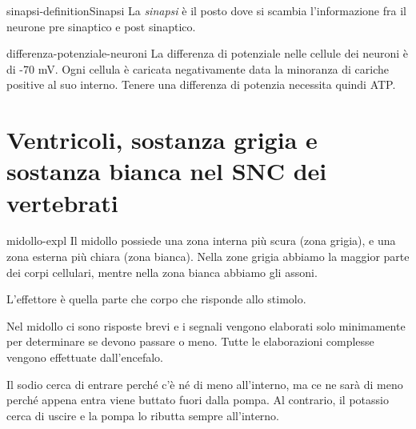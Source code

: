 \documentclass[preview]{standalone}
\begin{document}
\begin{snippetdefinition}{sinapsi-definition}{Sinapsi}
    La \textit{sinapsi} è il posto dove si scambia l'informazione
    fra il neurone pre sinaptico e post sinaptico.
\end{snippetdefinition}

\begin{snippet}{differenza-potenziale-neuroni}
    La differenza di potenziale nelle cellule dei neuroni è di -70 mV. Ogni cellula è caricata
    negativamente data la minoranza di cariche positive al suo interno.
    Tenere una differenza di potenzia necessita quindi ATP.
\end{snippet}

\section{Ventricoli, sostanza grigia e sostanza bianca nel SNC dei vertebrati}

\begin{snippet}{midollo-expl}
    Il midollo possiede una zona interna più scura (zona grigia), e una zona esterna più chiara
    (zona bianca). Nella zone grigia abbiamo la maggior parte dei corpi cellulari,
    mentre nella zona bianca abbiamo gli assoni.

    L'effettore è quella parte che corpo che risponde allo stimolo.

    Nel midollo ci sono risposte brevi e i segnali vengono elaborati solo minimamente per determinare se devono passare o meno.
    Tutte le elaborazioni complesse vengono effettuate dall'encefalo.

    Il sodio cerca di entrare perché c'è né di meno all'interno, ma ce ne sarà di meno perché appena entra
    viene buttato fuori dalla pompa.
    Al contrario, il potassio cerca di uscire e la pompa lo ributta sempre all'interno.

\end{snippet}
\end{document}
